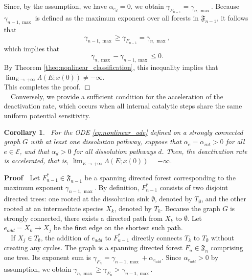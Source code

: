 \documentclass[11pt,a4paper]{article}
\newtheorem{coll}{Corollary}[section]
\begin{document}
Since, by the assumption, we have $\alpha_{e_d} = 0$, we obtain $\gamma_{F_{n-1}} = \gamma_{n, \max}$. Because $\gamma_{n-1, \max}$ is defined as the maximum exponent over all forests in $\mathfrak{F}_{n-1}$, it follows that
\begin{equation}
\gamma_{n-1, \max} \ge \gamma_{F_{n-1}} = \gamma_{n, \max},
\end{equation}
which implies that
\begin{equation}
\gamma_{n, \max} - \gamma_{n-1, \max} \le 0.
\end{equation}
By Theorem \ref{theo:nonlinear_classification}, this inequality implies that $\lim_{E \to +\infty}\Lambda(E;x(0)) \not = -\infty$. \\
This completes the proof. \hfill $\Box$\\[0.2cm]
~~Conversely, we provide a sufficient condition for the acceleration of the deactivation rate, which occurs when all internal catalytic steps share the same uniform potential sensitivity.
\begin{coll}~For the ODE \eqref{eq:nonlinear_ode} defined on a strongly connected graph $G$ with at least one dissolution pathway, suppose that $\alpha_e = \alpha_{int} > 0$ for all $e \in \mathcal{E}$, and that $\alpha_d > 0$ for all dissolution pathways $d$. Then, the deactivation rate is accelerated, that is, $\lim_{E \to +\infty}\Lambda(E;x(0)) = -\infty$.
\end{coll}
\noindent
{\bf Proof}~~Let $F_{n-1}^* \in \mathfrak{F}_{n-1}$ be a spanning directed forest corresponding to the maximum exponent $\gamma_{n-1, \max}$. By definition, $F_{n-1}^*$ consists of two disjoint directed trees: one rooted at the dissolution sink $\emptyset$, denoted by $T_\emptyset$, and the other rooted at an intermediate species $X_k$, denoted by $T_k$. Because the graph $G$ is strongly connected, there exists a directed path from $X_k$ to $\emptyset$. Let $e_{add} = X_k \to X_j$ be the first edge on the shortest such path.\\
\noindent
~~If $X_j \in T_\emptyset$, the addition of $e_{add}$ to $F_{n-1}^*$ directly connects $T_k$ to $T_\emptyset$ without creating any cycles. The graph is a spanning directed forest $F_n \in \mathfrak{F}_n$ comprising one tree. Its exponent sum is $\gamma_{F_n} = \gamma_{n-1, \max} + \alpha_{e_{add}}$. Since $\alpha_{e_{add}} > 0$ by assumption, we obtain $\gamma_{n, \max} \ge \gamma_{F_n} > \gamma_{n-1, \max}$.\\
\end{document}
